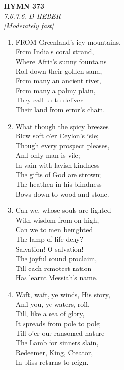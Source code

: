 \documentclass[11pt,a4paper]{article}
\begin{document}
\newpage
\begin{center}
    {\Large \textbf{HYMN 373}}
    \\
    \textit{7.6.7.6. D HEBER}
    \\
    \textit{\small [Moderately fast]}
\end{center}
\vspace{1em}

\begin{enumerate}
    \item FROM Greenland's icy mountains, \\
        From India's coral strand, \\
        Where Afric's sunny fountains \\
        Roll down their golden sand, \\
        From many an ancient river, \\
        From many a palmy plain, \\
        They call us to deliver \\
        Their land from error's chain.

    \item What though the spicy breezes \\
        Blow soft o'er Ceylon's isle; \\
        Though every prospect pleases, \\
        And only man is vile; \\
        In vain with lavish kindness \\
        The gifts of God are strown; \\
        The heathen in his blindness \\
        Bows down to wood and stone.

    \item Can we, whose souls are lighted \\
        With wisdom from on high, \\
        Can we to men benighted \\
        The lamp of life deny? \\
        Salvation! O salvation! \\
        The joyful sound proclaim, \\
        Till each remotest nation \\
        Has learnt Messiah's name.

    \item Waft, waft, ye winds, His story, \\
        And you, ye waters, roll, \\
        Till, like a sea of glory, \\
        It spreads from pole to pole; \\
        Till o'er our ransomed nature \\
        The Lamb for sinners slain, \\
        Redeemer, King, Creator, \\
        In bliss returns to reign.

\end{enumerate}
\end{document}
